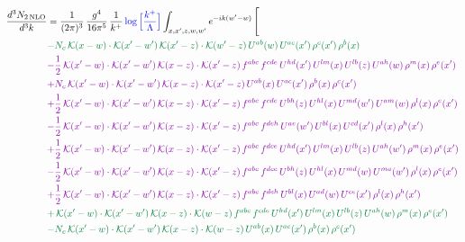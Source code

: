 \documentclass[10pt]{article}
\numberwithin{equation}{section}
\newcommand{\new}[1]{{\color{blue}#1}}
\begin{document}
\begin{align}
\frac{d^{3}N_{2\,\mathrm{NLO}}}{d^{3}k} & = \frac{1}{(2\pi)^{3}}\,\frac{g^{4}}{16\pi^{5}}\,\frac{1}{k^{+}}\,\new{\log\Big[\frac{k^{+}}{\Lambda}\Big]}\int_{x,x',z,w,w'}e^{-ik(w'-w)}\,\Bigg[\notag\\ &{\color{JIM} -N_{c}\,\mathcal{K}(x-w)\cdot\mathcal{K}(x'-w')\,\mathcal{K}(x'-z)\cdot\mathcal{K}(w'-z)\,U^{ab}(w)\,U^{ac}(x')\,\rho^{c}(x')\,\rho^{b}(x)} \notag\\
&{\color{CC} -\frac{1}{2}\,\mathcal{K}(x'-w)\cdot\mathcal{K}(x'-w')\,\mathcal{K}(x-z)\cdot\mathcal{K}(x'-z)\,f^{abc}\,f^{cde}\,U^{hd}(x')\,U^{lm}(x)\,U^{lb}(z)\,U^{ah}(w)\,\rho^{m}(x)\,\rho^{e}(x')} \notag\\
&{\color{CC} +N_{c}\,\mathcal{K}(x'-w)\cdot\mathcal{K}(x'-w')\,\mathcal{K}(x-z)\cdot\mathcal{K}(x'-z)\,U^{ab}(x)\,U^{ac}(x')\,\rho^{b}(x)\,\rho^{c}(x')} \notag\\
&{\color{CC} +\frac{1}{2}\,\mathcal{K}(x'-w)\cdot\mathcal{K}(x'-w')\,\mathcal{K}(x-z)\cdot\mathcal{K}(x'-z)\,f^{abc}\,f^{cde}\,U^{bh}(z)\,U^{hl}(x)\,U^{md}(w')\,U^{am}(w)\,\rho^{l}(x)\,\rho^{e}(x')} \notag\\
&{\color{CC} -\frac{1}{2}\,\mathcal{K}(x'-w)\cdot\mathcal{K}(x'-w')\,\mathcal{K}(x-z)\cdot\mathcal{K}(x'-z)\,f^{abc}\,f^{deh}\,U^{ae}(w')\,U^{bl}(x)\,U^{cd}(x')\,\rho^{l}(x)\,\rho^{h}(x')} \notag \\ &{\color{CC} +\frac{1}{2}\,\mathcal{K}(x'-w)\cdot\mathcal{K}(x'-w')\,\mathcal{K}(x-z)\cdot\mathcal{K}(x'-z)\,f^{abc}\,f^{dce}\,U^{hd}(x')\,U^{lm}(x)\,U^{lb}(z)\,U^{ah}(w')\,\rho^{m}(x)\,\rho^{e}(x')} \notag\\
&{\color{CC} -\frac{1}{2}\,\mathcal{K}(x'-w)\cdot\mathcal{K}(x'-w')\,\mathcal{K}(x-z)\cdot\mathcal{K}(x'-z)\,f^{abc}\,f^{dce}\,U^{bh}(z)\,U^{hl}(x)\,U^{md}(w)\,U^{ma}(w')\,\rho^{l}(x)\,\rho^{e}(x')} \notag\\
&{\color{CC} +\frac{1}{2}\,\mathcal{K}(x'-w)\cdot\mathcal{K}(x'-w')\,\mathcal{K}(x-z)\cdot\mathcal{K}(x'-z)\,f^{abc}\,f^{deh}\,U^{bl}(x)\,U^{ad}(w)\,U^{ce}(x')\,\rho^{l}(x)\,\rho^{h}(x')} \notag\\
&{\color{JIM} +\,\mathcal{K}(x'-w)\cdot\mathcal{K}(x'-w')\,\mathcal{K}(x-z)\cdot\mathcal{K}(w-z)\,f^{abc}\,f^{cde}\,U^{hd}(x')\,U^{lm}(x)\,U^{lb}(z)\,U^{ah}(w)\,\rho^{m}(x)\,\rho^{e}(x')} \notag\\
&{\color{JIM} -N_{c}\,\mathcal{K}(x'-w)\cdot\mathcal{K}(x'-w')\,\mathcal{K}(x-z)\cdot\mathcal{K}(w-z)\,U^{ab}(x)\,U^{ac}(x')\,\rho^{b}(x)\,\rho^{c}(x')} \notag\\

\end{align}
\end{document}
